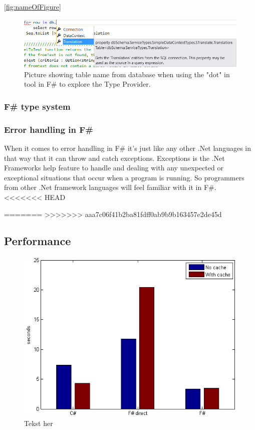 \documentclass[12pt, a4paper]{article}
\begin{document}
\ref{fig:nameOfFigure}

\begin{figure}[!h]
    \includegraphics[width=\textwidth]{visualstudio1}
    \centering
    \caption{Picture showing table name from database when using the "dot" in tool in F\# to explore the Type Provider.}
    \label{fig:DotInTool}
\end{figure}

\subsubsection{F\# type system}

\subsubsection{Error handling in F\#}
When it comes to error handling in F\# it's just like any other .Net languages in that way that it can throw and catch exceptions. Exceptions is the .Net Frameworks help feature to handle and dealing with any unexpected or exceptional situations that occur when a program is running. So programmers from other .Net framework languages will feel familiar with it in F\#. \\

<<<<<<< HEAD

=======
>>>>>>> aaa7c06f41b2ba81fdff0ab9b9b163457e2de45d
\newpage
\subsection{Performance}

\begin{figure}[!h]
    \includegraphics[scale=0.8]{averageChart1}
    \centering

    \caption{Tekst her}
\end{figure}
\end{document}
